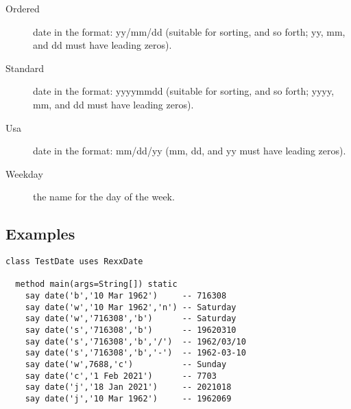 \begin{description}
\item[Ordered]
date in the format: yy/mm/dd (suitable for sorting, and so forth; yy, mm, and dd must have leading zeros).
\item[Standard]
date in the format: yyyymmdd (suitable for sorting, and so forth; yyyy, mm, and dd must have leading zeros).
\item[Usa]
date in the format: mm/dd/yy (mm, dd, and yy must have leading zeros).
\item[Weekday]
the name for the day of the week.
\end{description}
\subsection{Examples}

\begin{lstlisting}[label=datessexample,caption=Example of using Date()]
  class TestDate uses RexxDate

  method main(args=String[]) static
    say date('b','10 Mar 1962')     -- 716308
    say date('w','10 Mar 1962','n') -- Saturday
    say date('w','716308','b')      -- Saturday
    say date('s','716308','b')      -- 19620310 
    say date('s','716308','b','/')  -- 1962/03/10
    say date('s','716308','b','-')  -- 1962-03-10
    say date('w',7688,'c')          -- Sunday
    say date('c','1 Feb 2021')      -- 7703
    say date('j','18 Jan 2021')     -- 2021018
    say date('j','10 Mar 1962')     -- 1962069
\end{lstlisting}

